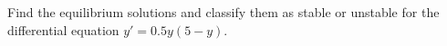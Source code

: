 
\begin{example} \label{eg:DE.1.3} %
Find the equilibrium solutions and classify them as stable or unstable for the differential equation $y' = 0.5y(5-y)$.

\solution 
\end{example}